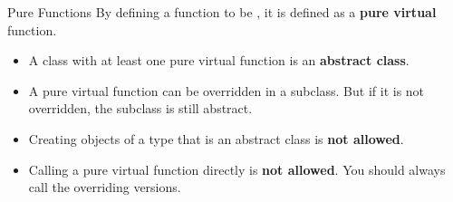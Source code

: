 \documentclass{beamer}
\begin{document}
\begin{frame}[fragile]{Pure \virtual Functions}
    By defining a function to be , it is defined as a \textbf{pure virtual} function.
    \begin{itemize}
        \item A class with at least one pure virtual function is an \textbf{abstract class}.
        \item A pure virtual function can be overridden in a subclass. But if it is not overridden, the subclass is still abstract.
        \item Creating objects of a type that is an abstract class is \textbf{not allowed}.
        \item Calling a pure virtual function directly is \textbf{not allowed}. You should always call the overriding versions.
    \end{itemize}
\end{frame}
\end{document}
